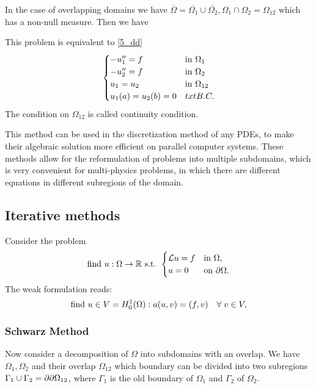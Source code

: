 In the case of overlapping domains we have \(\overline{\Omega} = \overline{\Omega_1} \cup \overline{\Omega_2}, \Omega_1 \cap \Omega_2 = \Omega_{12}\) which has a non-null measure.
Then we have
\begin{proposition}
    This problem is equivalent to \eqref{5_dd}
    \begin{equation}
        \begin{cases}
            -u''_1 = f & \text{in }\Omega_1 \\
            -u''_2 = f & \text{in }\Omega_2 \\
            u_1 =  u_2 & \text{in } \Omega_{12} \\
            u_1(a) = u_2(b) = 0 & txt{B.C.}
        \end{cases}
        \label{8_dd}
    \end{equation}
    The condition on \(\Omega_{12}\) is called continuity condition.
\end{proposition}
This method can be used in the discretization method of any PDEs, to make their algebraic solution more efficient on parallel computer systems. These methods allow for the reformulation of problems into multiple subdomains, which is very convenient for multi-physics problems, in which there are different equations in different subregions of the domain.

\subsection{Iterative methods}
Consider the problem
\begin{equation}
    \text{find } u :\Omega \to \mathbb{R} \text{ s.t. }
    \begin{cases}
        \mathcal{L} u = f & \text{in } \Omega, \\ 
        u = 0 & \text{on } {\partial\Omega}.
    \end{cases}
    \label{model_problem_dd}
\end{equation}
The weak formulation reads: 
\begin{equation*}
    \text{find } u \in V = H^1_0(\Omega) : a(u,v) = (f,v) \quad \forall \; v \in V,
\end{equation*}
\subsubsection*{Schwarz Method}
Now consider a decomposition of \(\Omega\) into subdomains with an overlap. We have \(\Omega_1,\Omega_2\) and their overlap \(\Omega_{12}\) which boundary can be divided into two subregions \(\Gamma_1 \cup \Gamma_2 = \partial{\partial\Omega}_{12}\), where \(\Gamma_1\) is the old boundary of \(\Omega_1\) and \(\Gamma_2\) of \(\Omega_2\). 

